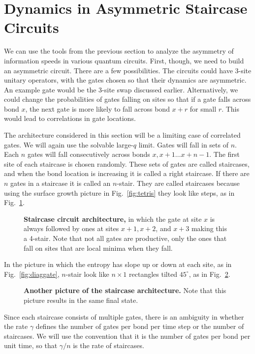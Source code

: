 \section{Dynamics in Asymmetric Staircase Circuits} \label{sec:stairs}

We can use the tools from the previous section to analyze the asymmetry of information speeds in various quantum circuits. First, though, we need to build an asymmetric circuit. There are a few possibilities. The circuits could have 3-site unitary operators, with the gates chosen so that their dynamics are asymmetric. An example gate would be the 3-site swap discussed earlier. Alternatively, we could change the probabilities of gates falling on sites so that if a gate falls across bond $x$, the next gate is more likely to fall across bond $x+r$ for small $r$. This would lead to correlations in gate locations.

The architecture considered in this section will be a limiting case of correlated gates. We will again use the solvable large-$q$ limit. Gates will fall in sets of $n$. Each $n$ gates will fall consecutively across bonds $x, x+1\dots x+n-1$. The first site of each staircase is chosen randomly. These sets of gates are called staircases, and when the bond location is increasing it is called a right staircase. If there are $n$ gates in a staircase it is called an $n$-stair. They are called staircases because using the surface growth picture in Fig.~\ref{fig:tetris} they look like steps, as in Fig.~\ref{fig:stairs}. 
\begin{figure}
	\centering
	
	\caption{\textbf{Staircase circuit architecture,} in which the gate at site $x$ is always followed by ones at sites $x+1, x+2$, and $x+3$ making this a 4-stair. Note that not all gates are productive, only the ones that fall on sites that are local minima when they fall.}
	\label{fig:stairs}
\end{figure}
In the picture in which the entropy has slope up or down at each site, as in Fig.~\ref{fig:diaggate}, $n$-stair look like $n\times 1$ rectangles tilted $45^\circ$, as in Fig.~\ref{fig:diagstairs}.
\begin{figure}
	\centering
	
	\caption{\textbf{Another picture of the staircase architecture.} Note that this picture results in the same final state.}
	\label{fig:diagstairs}
\end{figure}
Since each staircase consists of multiple gates, there is an ambiguity in whether the rate $\gamma$ defines the number of gates per bond per time step or the number of staircases. We will use the convention that it is the number of gates per bond per unit time, so that $\gamma/n$ is the rate of staircases.

